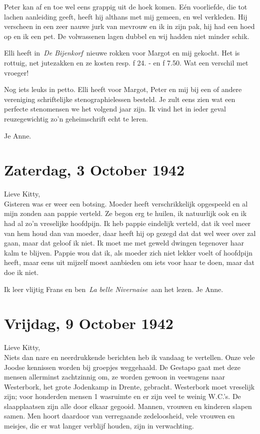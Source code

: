 \documentclass{book}
\begin{document}
Peter kan af en toe wel eens grappig uit de hoek komen. Eén voorliefde, die tot
lachen aanleiding geeft, heeft hij althans met mij gemeen, en wel verkleden. Hij
verscheen in een zeer nauwe jurk van mevrouw en ik in zijn pak, hij had een hoed
op en ik een pet. De volwassenen lagen dubbel en wij hadden niet minder schik.

Elli heeft in~\emph{De Bijenkorf}~nieuwe rokken voor Margot en mij gekocht. Het
is rottuig, net jutezakken en ze kosten resp. ƒ 24. - en ƒ 7.50. Wat een
verschil met vroeger!

Nog iets leuks in petto. Elli heeft voor Margot, Peter en mij bij een of andere
vereniging schriftelijke stenographielessen besteld. Je zult eens zien wat een
perfecte stenomensen we het volgend jaar zijn. Ik vind het in ieder geval
reuzegewichtig zo'n geheimschrift echt te leren.

Je Anne.

\section*{Zaterdag, 3 October 1942}

Lieve Kitty,\\
Gisteren was er weer een botsing. Moeder heeft verschrikkelijk
opgespeeld en al mijn zonden aan pappie verteld. Ze begon erg te huilen, ik
natuurlijk ook en ik had al zo'n vreselijke hoofdpijn. Ik heb pappie eindelijk
verteld, dat ik veel meer van hem houd dan van moeder, daar heeft hij op gezegd
dat dat wel weer over zal gaan, maar dat geloof ik niet. Ik moet me met geweld
dwingen tegenover haar kalm te blijven. Pappie wou dat ik, als moeder zich niet
lekker voelt of hoofdpijn heeft, maar eens uit mijzelf moest aanbieden om iets
voor haar te doen, maar dat doe ik niet.

Ik leer vlijtig Frans en ben~\emph{La belle Nivernaise}~aan het lezen.  Je Anne.

\section*{Vrijdag, 9 October 1942}

Lieve Kitty,\\
Niets dan nare en neerdrukkende berichten heb ik vandaag te
vertellen. Onze vele Joodse kennissen worden bij groepjes weggehaald. De Gestapo
gaat met deze mensen allerminst zachtzinnig om, ze worden gewoon in veewagens
naar Westerbork, het grote Jodenkamp in Drente, gebracht. Westerbork moet
vreselijk zijn; voor honderden mensen 1 wasruimte en er zijn veel te weinig
W.C.'s. De slaapplaatsen zijn alle door elkaar gegooid.  Mannen, vrouwen en
kinderen slapen samen. Men hoort daardoor van verregaande zedeloosheid, vele
vrouwen en meisjes, die er wat langer verblijf houden, zijn in verwachting.
\end{document}
